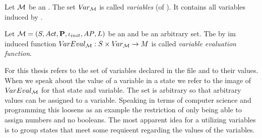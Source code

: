 \documentclass[preview]{standalone}
\begin{document}
%
%
%

\begin{definition}
	Let ${{\mathcal{M}}}$ be an \mdpN. The set ${V\!ar_{{{\mathcal{M}}}}}$ is called \emph{variables} (of \mdp). It contains all variables induced by \mdp.
\end{definition}

\begin{definition}
	Let ${{\mathcal{M}}} = {({S}, {Act}, {\textbf{P}}, {\iota_{init}}, {AP}, {L})}$ be an \mdpN and \varevalimgset be an arbitrary set. The by im induced function ${V\!arEval_{{{\mathcal{M}}}}} : {S} \times {V\!ar_{\ensuremath{{{\mathcal{M}}}}}} \to {\ensuremath{{M}}}$ is called \emph{variable evaluation function}.
\end{definition} 

For this thesis \vars refers to the set of variables declared in the \prism file and \vareval to their values.
When we speak about the value of a variable in a state we refer to the image of ${V\!arEval_{{{\mathcal{M}}}}}$ for that state and variable. The set \varevalimgset is arbitrary so that arbitrary values can be assigned to a variable. Speaking in terms of computer science and programming this loosens as an example the restriction of only being able to assign numbers and no booleans. The most apparent idea for a \viewN utilizing variables is to group states that meet some requieent regarding the values of the variables.
\end{document}
